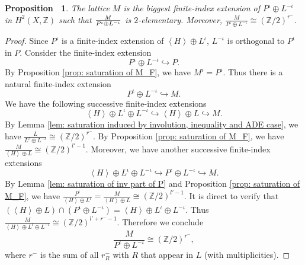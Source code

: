\documentclass[12pt,reqno,a4paper]{amsart}
\newtheorem{prop}[thm]{Proposition~}
\theoremstyle{remark}
\theoremstyle{definition}
\begin{document}
\begin{prop}
\label{prop: M_F = Z_2-saturation}
        The lattice $M$ is the biggest finite-index extension of $P^\iota \oplus L^{-\iota}$ in $H^2(X,\mathbb{Z})$ such that $M\over{P^{\iota}\oplus L^{-\iota}}$ is $2$-elementary. Moreover, $\frac{M}{P^{\iota}\oplus L^{-\iota}}\cong (\mathbb{Z}/2)^{r^-}$.
                        \end{prop}
\begin{proof}
    Since $P^{\iota}$ is a finite-index extension of $\left\langle H\right\rangle\oplus L^{\iota}$, $L^{-\iota}$ is orthogonal to $P^{\iota}$ in $P$.
    Consider the finite-index extension
    \begin{equation*}
        P^{\iota}\oplus L^{-\iota}\hookrightarrow P.
    \end{equation*}
    By Proposition \ref{prop: saturation of M_F}, we have $M^{\iota} = P^{\iota}$.
    Thus there is a natural finite-index extension 
        \begin{equation*}
        P^{\iota}\oplus L^{-\iota} \hookrightarrow M.
    \end{equation*}
            We have the following successive finite-index extensions
    \begin{equation*}
        \left\langle H \right\rangle \oplus L^{\iota} \oplus L^{-\iota} \hookrightarrow \left\langle H \right\rangle \oplus L \hookrightarrow M.
    \end{equation*}
    By Lemma \ref{lem: saturation induced by involution, inequality and ADE case}, we have $\frac{L}{L^{\iota} \oplus L^{-\iota}} \cong (\mathbb{Z}/2)^{r^-}$.
    By Proposition \ref{prop: saturation of M_F}, we have $\frac{M}{\left\langle H\right\rangle \oplus L}\cong (\mathbb{Z}/2)^{l'-1}$.
    Moreover, we have another successive finite-index extensions 
    \begin{equation*}
        \left\langle H \right\rangle \oplus L^{\iota} \oplus L^{-\iota} \hookrightarrow P^{\iota}\oplus L^{-\iota} \hookrightarrow M.
    \end{equation*}
    By Lemma \ref{lem: saturation of inv part of P} and Proposition \ref{prop: saturation of M_F}, we have $\frac{P^{\iota}}{\left\langle H \right\rangle \oplus L^{\iota}} = \frac{M}{\left\langle H \right\rangle \oplus L} \cong (\mathbb{Z}/2)^{l'-1}$.
    It is direct to verify that $(\left\langle H \right\rangle \oplus L)\cap (P^{\iota}\oplus L^{-\iota}) = \left\langle H \right\rangle \oplus L^\iota \oplus L^{-\iota}$.
    Thus $\frac{M}{\left\langle H \right\rangle \oplus L^\iota \oplus L^{-\iota}} \cong (\mathbb{Z}/2)^{l'+r^--1}$.
    Therefore we conclude
    \begin{equation*}
    \label{eqn: saturation of M over P^iota oplus L^-iota}
        \frac{M}{P^{\iota}\oplus L^{-\iota}}\cong (\mathbb{Z}/2)^{r^-},
    \end{equation*}
    where $r^-$ is the sum of all $r_R^-$ with $R$ that appear in $L$ (with multiplicities).


\end{proof}
\end{document}
